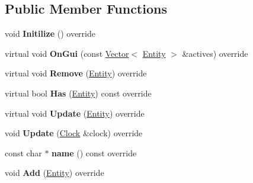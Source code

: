 \subsection*{Public Member Functions}
\begin{DoxyCompactItemize}
\item 
\mbox{\label{classnabla_1_1_polygon_system_ae9b0e57150a4714c52b79cc4356da7cc}} 
void {\bfseries Initilize} () override
\item 
\mbox{\label{classnabla_1_1_polygon_system_ac3b7d9ce7bf3dfc00f38cf93d4b2bc41}} 
virtual void {\bfseries On\+Gui} (const \mbox{\hyperlink{classnabla_1_1_s_t_l_vector_ex}{Vector}}$<$ \mbox{\hyperlink{structnabla_1_1_entity}{Entity}} $>$ \&actives) override
\item 
\mbox{\label{classnabla_1_1_polygon_system_a87a9c2e0f0fa43cf0b91cf25f7e513fd}} 
virtual void {\bfseries Remove} (\mbox{\hyperlink{structnabla_1_1_entity}{Entity}}) override
\item 
\mbox{\label{classnabla_1_1_polygon_system_a0112d7d85a58c94f2f7f178153d3579f}} 
virtual bool {\bfseries Has} (\mbox{\hyperlink{structnabla_1_1_entity}{Entity}}) const override
\item 
\mbox{\label{classnabla_1_1_polygon_system_ad7f4f20b7b50fa2096d20697a3935601}} 
virtual void {\bfseries Update} (\mbox{\hyperlink{structnabla_1_1_entity}{Entity}}) override
\item 
\mbox{\label{classnabla_1_1_polygon_system_a6930777285a18998baf5edc124819261}} 
void {\bfseries Update} (\mbox{\hyperlink{classnabla_1_1_clock}{Clock}} \&clock) override
\item 
\mbox{\label{classnabla_1_1_polygon_system_a017e75cd02e943da81057c5aba6d6362}} 
const char $\ast$ {\bfseries name} () const override
\item 
\mbox{\label{classnabla_1_1_polygon_system_a3cf801f2854fbc37559cd95e4d71546c}} 
void {\bfseries Add} (\mbox{\hyperlink{structnabla_1_1_entity}{Entity}}) override

\end{DoxyCompactItemize}
